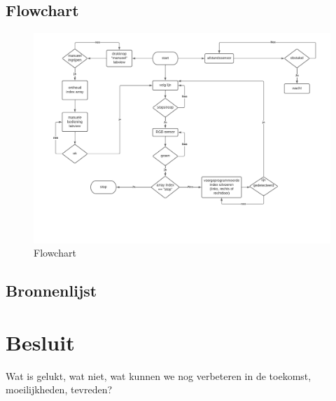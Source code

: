 \documentclass[kulak]{kulakarticle} %
\begin{document}
\subsection{Flowchart}
\begin{figure}[h]
	\centering
	\includegraphics[width=.7\textwidth]{flowchart auto}
	\caption{Flowchart}
	\label{fig:flowchart}
\end{figure}
\subsection{Bronnenlijst}

\section*{Besluit}

Wat is gelukt, wat niet, wat kunnen we nog verbeteren in de toekomst, moeilijkheden, tevreden?
\end{document}
